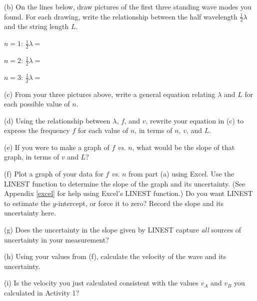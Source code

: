 (b) On the lines below, draw pictures of the first three standing wave modes you found.  For each drawing, write the relationship between the half wavelength $\frac{1}{2}\lambda$ and the string length $L$.

\begin{center}
$n=1$: 
\raisebox{-0.15in}{\rule{3pt}{0.4in}}\raisebox{.05in}{\rule{2.5in}{0.1pt}}\raisebox{-0.15in}{\rule{3pt}{0.4in}}
\hspace{0.3in}$\frac{1}{2}\lambda=$

$n=2$:
\raisebox{-0.15in}{\rule{3pt}{0.4in}}\raisebox{.05in}{\rule{2.5in}{0.1pt}}\raisebox{-0.15in}{\rule{3pt}{0.4in}}
\hspace{0.3in}$\frac{1}{2}\lambda=$

$n=3$:
\raisebox{-0.15in}{\rule{3pt}{0.4in}}\raisebox{.05in}{\rule{2.5in}{0.1pt}}\raisebox{-0.15in}{\rule{3pt}{0.4in}}
\hspace{0.3in}$\frac{1}{2}\lambda=$
\end{center}

(c) From your three pictures above, write a general equation relating $\lambda$ and $L$ for each possible value of $n$.
\answerspace{2cm}

(d) Using the relationship between $\lambda$, $f$, and $v$, rewrite your equation in (c) to express the frequency $f$ for each value of $n$, in terms of $n$, $v$, and $L$.
\answerspace{2cm}

(e) If you were to make a graph of $f$ \textit{vs.} $n$, what would be the slope of that graph, in terms of $v$ and $L$?
\answerspace{2cm}

\pagebreak[3]
(f) Plot a graph of your data for $f$ \textit{vs.} $n$ from part (a) using Excel. Use the LINEST function to determine the slope of the graph and its uncertainty. (See Appendix \ref{excel} for help using Excel's LINEST function.)  Do you want LINEST to estimate the $y$-intercept, or force it to zero?  Record the slope and its uncertainty here.
\answerspace{3cm}



(g) Does the uncertainty in the slope given by LINEST capture \textit{all} sources of uncertainty in your measurement?
\answerspace{2cm}

(h) Using your values from (f), calculate the velocity of the wave and its uncertainty. 
\answerspace{4cm}

(i) Is the velocity you just calculated consistent with the values $v_A$ and $v_B$ you calculated in Activity 1?  
\answerspace{3cm}


%




